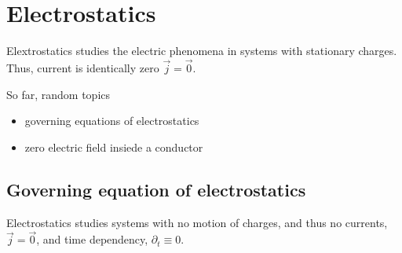 \documentclass[letterpaper,10pt,english]{jupyterBook}
\begin{document}
\section{Electrostatics}
\label{\detokenize{ch/regimes-electrostatics:electrostatics}}\label{\detokenize{ch/regimes-electrostatics:classical-electromagnetism-electrostatics}}\label{\detokenize{ch/regimes-electrostatics::doc}}
\sphinxAtStartPar
Elextrostatics studies the electric phenomena in systems with stationary charges. Thus, current is identically zero \(\vec{j} = \vec{0}\).

\sphinxAtStartPar
So far, random topics
\begin{itemize}
\item {} 
\sphinxAtStartPar
governing equations of electrostatics

\item {} 
\sphinxAtStartPar
zero electric field insiede a conductor

\end{itemize}


\subsection{Governing equation of electrostatics}
\label{\detokenize{ch/regimes-electrostatics:governing-equation-of-electrostatics}}
\sphinxAtStartPar
Electrostatics studies systems with no motion of charges, and thus no currents, \(\vec{j} = \vec{0}\), and time dependency, \(\partial_t \equiv 0\).
\end{document}
